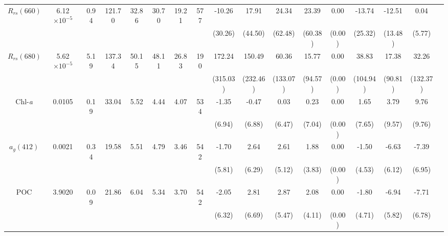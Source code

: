 \documentclass[preview]{standalone}
\begin{document}
\begin{tabular}{ccccccccccccccccc}
$R_{rs}(660)$ 	& 6.12$\times10^{-5}$ 	& 0.94 	& 121.70 	& 32.86 & 30.70 & 19.21 & 577  	&  -10.26  	&  17.91   	& 24.34 	&  23.39 	&  0.00   	& -13.74    &-12.51    	&  0.04    	\\
 				&						&		&			&		&		&		&		&  (30.26) 	&  (44.50) 	&  (62.48) 	&  (60.38) 	&   (0.00) 	&  (25.32) 	&  (13.48) 	&   (5.77) 	\\ \hline 
$R_{rs}(680)$ 	& 5.62$\times10^{-5}$ 	& 5.19 	& 137.34 	& 50.15 & 48.11 & 26.83 & 190  	&  172.24  	& 150.49  	& 60.36  	&  15.77  	&  0.00   	&  38.83    & 17.38    	& 32.26   	\\
 				&						&		&			&		&		&		&		& (315.03) 	& (232.46) 	&  (133.07)	&   (94.57)	&    (0.00)	&  (104.94)	& (90.81) 	& (132.37) 	\\ \hline
Chl-\it{a} 		&  0.0105             	& 0.19 	&  33.04  	&  5.52 &  4.44 &  4.07 & 534  	&  -1.35  	&   -0.47  	&    0.03	&    0.23  	&    0.00  	&    1.65  	&    3.79  	&    9.76  	\\
 				&						&		&			&		&		&		&		&  (6.94) 	&  (6.88) 	&  (6.47) 	&  (7.04) 	&  (0.00) 	&  (7.65) 	&  (9.57) 	&  (9.76) 	\\ \hline
$a_{g}(412)$ 	&  0.0021             	& 0.34 	&  19.58  	&  5.51 &  4.79 &  3.46 & 542  	&  -1.70  	&    2.64  	&    2.61  	&    1.88  	&    0.00  	&   -1.50  	&   -6.63  	&   -7.39  	\\
 				&						&		&			&		&		&		&		&  (5.81) 	&  (6.29) 	&  (5.12) 	&  (3.83) 	&  (0.00) 	&  (4.53) 	&  (6.12) 	&  (6.95) 	\\ \hline
POC 			&  3.9020             	& 0.09 	&  21.86  	&  6.04 &  5.34 &  3.70 & 542  	&  -2.05  	&    2.81  	&    2.87  	&    2.08  	&    0.00  	&   -1.80  	&   -6.94  	&   -7.71  	\\
 				&						&		&			&		&		&		&		&  (6.32) 	&  (6.69) 	&  (5.47) 	&  (4.11) 	&  (0.00) 	&  (4.71) 	&  (5.82) 	&  (6.78) 	\\ \hline
 \end{tabular}
\end{document}
